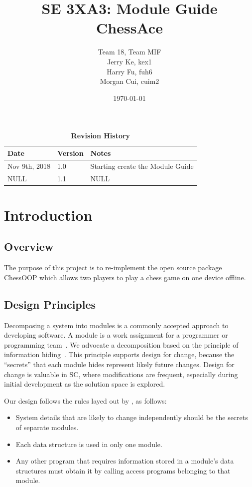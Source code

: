 \documentclass[12pt, titlepage]{article}
\title{SE 3XA3: Module Guide\\ChessAce}
\author{Team 18, Team MIF
		\\ Jerry Ke, kex1
		\\ Harry Fu, fuh6
		\\ Morgan Cui, cuim2
}
\date{\today}
\begin{document}
\maketitle

\tableofcontents
\listoftables
\listoffigures

\begin{table}[bp]
\caption{\bf Revision History}
\begin{tabularx}{\textwidth}{p{3cm}p{2cm}X}
\toprule {\bf Date} & {\bf Version} & {\bf Notes}\\
\midrule
Nov 9th, 2018 & 1.0 & Starting create the Module Guide \\
NULL & 1.1 & NULL\\
\bottomrule
\end{tabularx}
\end{table}




\section{Introduction}

\subsection{Overview}
The purpose of this project is to re-implement the open source package ChessOOP which allows two players to play a chess game on one device offline.

\subsection{Design Principles}
Decomposing a system into modules is a commonly accepted approach to developing
software.  A module is a work assignment for a programmer or programming
team~\citep{ParnasEtAl1984}.  We advocate a decomposition
based on the principle of information hiding~\citep{Parnas1972a}.  This
principle supports design for change, because the ``secrets'' that each module
hides represent likely future changes.  Design for change is valuable in SC,
where modifications are frequent, especially during initial development as the
solution space is explored.  ~\citep{Bokahari2018}

Our design follows the rules layed out by \citet{ParnasEtAl1984}, as follows:
\begin{itemize}
\item System details that are likely to change independently should be the
  secrets of separate modules.
\item Each data structure is used in only one module.
\item Any other program that requires information stored in a module's data
  structures must obtain it by calling access programs belonging to that module.
\end{itemize}
\end{document}

